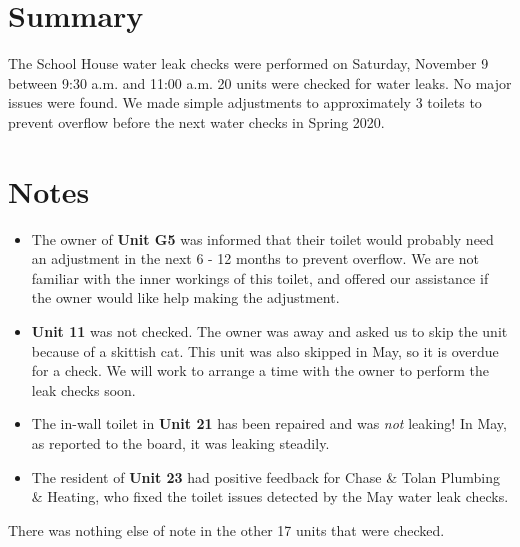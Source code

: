 \documentclass[letterpaper,10pt]{texMemo}
\begin{document}
\maketitle

\section*{Summary}

The School House water leak checks were performed on Saturday, November
9 between 9:30 a.m. and 11:00 a.m. 20 units were checked for water
leaks. No major issues were found. We made simple adjustments to
approximately 3 toilets to prevent overflow before the next water
checks in Spring 2020.

\section*{Notes}

\begin{itemize}

\item The owner of \textbf{Unit G5} was informed that their toilet
  would probably need an adjustment in the next 6 - 12 months to
  prevent overflow. We are not familiar with the inner workings of
  this toilet, and offered our assistance if the owner would like help
  making the adjustment.

\item \textbf{Unit 11} was not checked. The owner was away and asked
  us to skip the unit because of a skittish cat. This unit was also
  skipped in May, so it is overdue for a check. We will work to
  arrange a time with the owner to perform the leak checks soon.

\item The in-wall toilet in \textbf{Unit 21} has been repaired and was
  \emph{not} leaking! In May, as reported to the board, it was leaking
  steadily.

\item The resident of \textbf{Unit 23} had positive feedback for Chase
  \& Tolan Plumbing \& Heating, who fixed the toilet issues detected
  by the May water leak checks.

\end{itemize}

There was nothing else of note in the other 17 units that were
checked.
\end{document}
